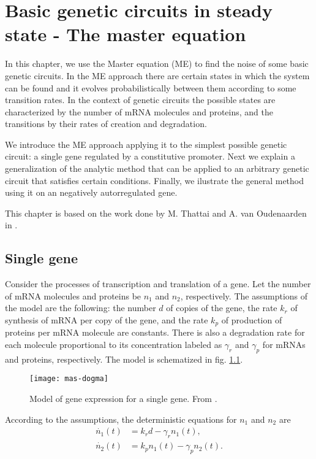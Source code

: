 \chapter{Basic genetic circuits in steady state - The master equation}
\label{ch:master}

In this chapter, we use the Master equation (ME) to find the noise of some basic genetic circuits. In the ME approach there are certain states in which the system can be found and it evolves probabilistically between them according to some transition rates. In the context of genetic circuits the possible states are characterized by the number of mRNA molecules and proteins, and the transitions by their rates of creation and degradation.

We introduce the ME approach applying it to the simplest possible genetic circuit: a single gene regulated by a constitutive promoter. Next we explain a generalization of the analytic method that can be applied to an arbitrary genetic circuit that satisfies certain conditions. Finally, we ilustrate the general method using it on an negatively autorregulated gene.

This chapter is based on the work done by M. Thattai and A. van Oudenaarden in \cite{thattai01}.

\section{Single gene}
\label{sec:mas-single_gene}
Consider the processes of transcription and translation of a gene. Let the number of mRNA molecules and proteins be $n_1$ and $n_2$, respectively. The assumptions of the model are the following: the number $d$ of copies of the gene, the rate $k_r$ of synthesis of mRNA per copy of the gene, and the rate $k_p$ of production of proteins per mRNA molecule are constants. There is also a degradation rate for each molecule proportional to its concentration labeled as $\gamma_r$ and $\gamma_p$ for mRNAs and proteins, respectively. The model is schematized in fig. \ref{fig:mas-dogma}.
\begin{figure}[H]
  \centering
  \texttt{[image: mas-dogma]}
  \caption[Model of gene expression for a single gene]{\label{fig:mas-dogma} Model of gene expression for a single gene. From \cite{thattai01}.}
\end{figure}

According to the assumptions, the deterministic equations for $n_1$ and $n_2$ are
\begin{equation}
  \label{eq:mas-simple_det_1}
  \begin{split}
    \dot{n_1}(t) &= k_rd-\gamma_rn_1(t),\\
    \dot{n_2}(t) &= k_pn_1(t)-\gamma_pn_2(t).
  \end{split}
\end{equation}

